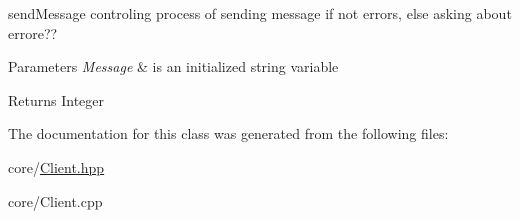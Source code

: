 send\+Message controling process of sending message if not errors, else asking about errore?? 


\begin{DoxyParams}{Parameters}
{\em Message} & is an initialized string variable \\
\hline
\end{DoxyParams}
\begin{DoxyReturn}{Returns}
Integer 
\end{DoxyReturn}


The documentation for this class was generated from the following files\+:\begin{DoxyCompactItemize}
\item 
core/\hyperlink{Client_8hpp}{Client.\+hpp}\item 
core/Client.\+cpp\end{DoxyCompactItemize}
